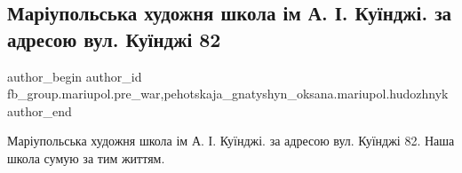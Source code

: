  
 
 
 
 

\subsection{Маріупольська художня школа ім А. І. Куїнджі. за адресою вул. Куїнджі 82}
\label{sec:31_01_2023.fb.fb_group.mariupol.pre_war.3.mar_upolska_khudozhn}
 
\ifcmt
 author_begin
   author_id fb_group.mariupol.pre_war,pehotskaja_gnatyshyn_oksana.mariupol.hudozhnyk
 author_end
\fi

Маріупольська художня школа ім А. І. Куїнджі. за адресою вул. Куїнджі 82. Наша школа сумую за тим життям.

